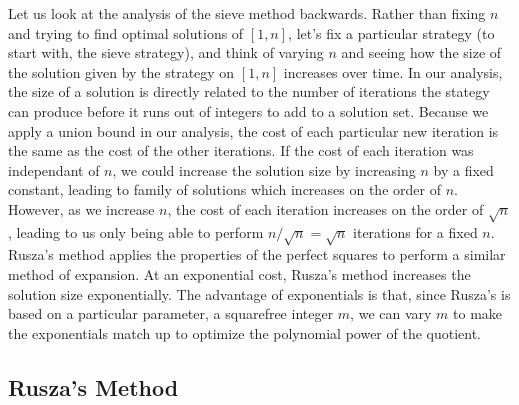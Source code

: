 \documentclass{article}
\theoremstyle{plain}
\theoremstyle{plain}
\begin{document}
Let us look at the analysis of the sieve method backwards. Rather than fixing $n$ and trying to find optimal solutions of $[1,n]$, let's fix a particular strategy (to start with, the sieve strategy), and think of varying $n$ and seeing how the size of the solution given by the strategy on $[1,n]$ increases over time. In our analysis, the size of a solution is directly related to the number of iterations the stategy can produce before it runs out of integers to add to a solution set. Because we apply a union bound in our analysis, the cost of each particular new iteration is the same as the cost of the other iterations. If the cost of each iteration was independant of $n$, we could increase the solution size by increasing $n$ by a fixed constant, leading to family of solutions which increases on the order of $n$. However, as we increase $n$, the cost of each iteration increases on the order of $\sqrt{n}$, leading to us only being able to perform $n/\sqrt{n} = \sqrt{n}$ iterations for a fixed $n$. Rusza's method applies the properties of the perfect squares to perform a similar method of expansion. At an exponential cost, Rusza's method increases the solution size exponentially. The advantage of exponentials is that, since Rusza's is based on a particular parameter, a squarefree integer $m$, we can vary $m$ to make the exponentials match up to optimize the polynomial power of the quotient.

\subsection{Rusza's Method}
\end{document}
